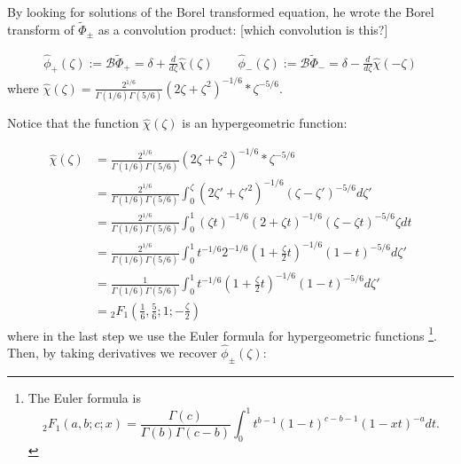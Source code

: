 \documentclass{article}
\newcommand{\series}[1]{\tilde{#1}}
\newcommand{\borel}{\mathcal{B}}
\theoremstyle{definition}
\theoremstyle{plain}
\newenvironment{todo}{\color{Coral}}{\color{black}}
\begin{document}
By looking for solutions of the Borel transformed equation, he wrote the Borel transform of $\series{\Phi}_{\pm}$ as a convolution product: \begin{todo}[which convolution is this?]\end{todo}

\begin{align*}
\hat{\phi}_+(\zeta):=\borel\series{\Phi}_+=\delta+\frac{d}{d\zeta}\hat{\chi}(\zeta)  \qquad \hat{\phi}_-(\zeta):=\borel\series{\Phi}_-=\delta-\frac{d}{d\zeta}\hat{\chi}(-\zeta)
\end{align*}
 where $\hat{\chi}(\zeta)=\frac{2^{1/6}}{\Gamma(1/6)\Gamma(5/6)}(2\zeta+\zeta^2)^{-1/6} \ast \zeta^{-5/6}$.

%

Notice that the function $\hat{\chi}(\zeta)$ is an hypergeometric function:

\begin{align*}
\hat{\chi}(\zeta)&=\frac{2^{1/6}}{\Gamma(1/6)\Gamma(5/6)}(2\zeta+\zeta^2)^{-1/6}\ast \zeta^{-5/6}\\
&=\frac{2^{1/6}}{\Gamma(1/6)\Gamma(5/6)}\int_0^{\zeta}(2\zeta'+\zeta'^2)^{-1/6} (\zeta-\zeta')^{-5/6}d\zeta'\\
&=\frac{2^{1/6}}{\Gamma(1/6)\Gamma(5/6)}\int_0^{1}(\zeta t)^{-1/6}(2+\zeta t)^{-1/6} (\zeta-\zeta t)^{-5/6} \zeta dt\\
&=\frac{2^{1/6}}{\Gamma(1/6)\Gamma(5/6)}\int_0^{1} t^{-1/6} 2^{-1/6}(1+\frac{\zeta}{2} t)^{-1/6} (1-t)^{-5/6}d\zeta'\\
&=\frac{1}{\Gamma(1/6)\Gamma(5/6)}\int_0^{1} t^{-1/6} (1+\frac{\zeta}{2} t)^{-1/6} (1-t)^{-5/6}d\zeta'\\
&={}_2F_1\left(\frac{1}{6},\frac{5}{6};1;-\frac{\zeta}{2}\right)
\end{align*}
where in the last step we use the Euler formula for hypergeometric functions \footnote{The Euler formula is \begin{equation}\label{Euler formula}
{}_{2}F_1\left(a,b;c;x\right)=\frac{\Gamma(c)}{\Gamma(b)\Gamma(c-b)}\int_0^1 t^{b-1}(1-t)^{c-b-1}(1-xt)^{-a}dt.
\end{equation}}. Then, by taking derivatives we recover $\hat{\phi}_{\pm}(\zeta)$: 
\end{document}
